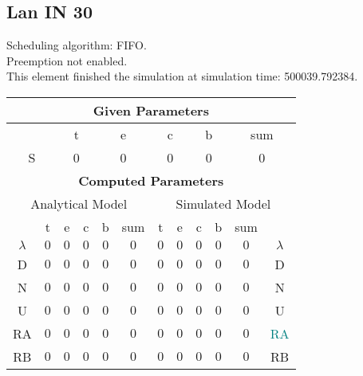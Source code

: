 \documentclass{article}
\begin{document}
\subsection{Lan IN 30}
Scheduling algorithm: FIFO.\\Preemption not enabled. \\This element finished the simulation at simulation time: 500039.792384.\\
\begin{table}[H]\centering\begin{tabular}{@{}c|cccc|c||cccc|c|c@{}}\toprule\multicolumn{12}{c}{\textbf{Given Parameters}}\\\midrule\multicolumn{2}{c|}{ } & \multicolumn{2}{c}{t} & \multicolumn{2}{c}{e} & \multicolumn{2}{c}{c} & \multicolumn{2}{c}{b} & \multicolumn{2}{|c}{sum} \\ \midrule\multicolumn{2}{c|}{S} & \multicolumn{2}{c}{0} & \multicolumn{2}{c}{0} & \multicolumn{2}{c}{0} & \multicolumn{2}{c}{0} & \multicolumn{2}{|c}{0}\\ \midrule\midrule\multicolumn{12}{c}{\textbf{Computed Parameters}}\\ \midrule\multicolumn{6}{c||}{Analytical Model} & \multicolumn{6}{c}{Simulated Model}\\ 
 \midrule & t & e & c & b & sum & t & e & c & b & sum &  \\ \midrule$\lambda$ &$0$ & $0$ & $0$ & $0$ & $0$ & $0$ & $0$ & $0$ & $0$ & $0$& $\lambda$ \\D & $0$ & $0$ & $0$ & $0$ & $0$ & $0$ & $0$ & $0$ & $0$ & $0$& D\\N & $0$ & $0$ & $0$ & $0$ & $0$ & $0$ & $0$ & $0$ & $0$ & $0$& N\\U & $0$ & $0$ & $0$ & $0$ & $0$ & $0$ & $0$ & $0$ & $0$ & $0$& U\\RA & $0$ & $0$ & $0$ & $0$ & $0$ & $0$ & $0$ & $0$ & $0$ & $0$& \textcolor{teal}{RA}\\RB & $0$ & $0$ & $0$ & $0$ & $0$ & $0$ & $0$ & $0$ & $0$ & $0$& RB\\
\bottomrule
\end{tabular}
\end{table}
\filbreak
\end{document}
